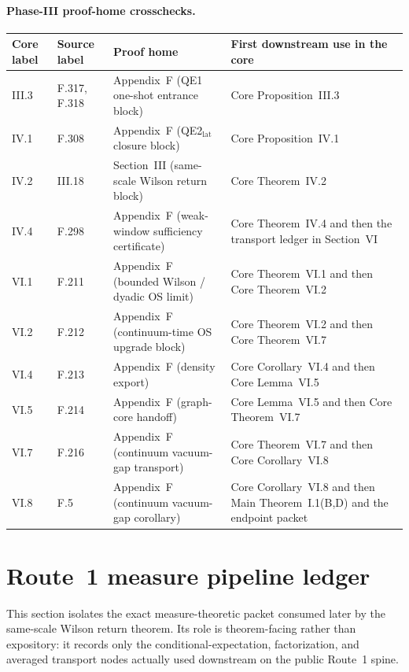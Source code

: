 \documentclass[preprint,aip,jmp,amsmath,amssymb,nofootinbib]{revtex4-2}
\begin{document}
\paragraph{Phase-III proof-home crosschecks.}
\begin{center}
\small
\setlength{\tabcolsep}{4pt}
\renewcommand{\arraystretch}{1.08}
\begin{tabular}{@{}p{0.95cm}p{1.2cm}p{4.0cm}p{4.2cm}@{}}
\toprule
\textbf{Core label} & \textbf{Source label} & \textbf{Proof home} & \textbf{First downstream use in the core}\\
\midrule
III.3 & F.317, F.318 & Appendix~F (QE1 one-shot entrance block) & Core Proposition~III.3\\
IV.1 & F.308 & Appendix~F (QE2$_{\mathrm{lat}}$ closure block) & Core Proposition~IV.1\\
IV.2 & III.18 & Section~III (same-scale Wilson return block) & Core Theorem~IV.2\\
IV.4 & F.298 & Appendix~F (weak-window sufficiency certificate) & Core Theorem~IV.4 and then the transport ledger in Section~VI\\
VI.1 & F.211 & Appendix~F (bounded Wilson / dyadic OS limit) & Core Theorem~VI.1 and then Core Theorem~VI.2\\
VI.2 & F.212 & Appendix~F (continuum-time OS upgrade block) & Core Theorem~VI.2 and then Core Theorem~VI.7\\
VI.4 & F.213 & Appendix~F (density export) & Core Corollary~VI.4 and then Core Lemma~VI.5\\
VI.5 & F.214 & Appendix~F (graph-core handoff) & Core Lemma~VI.5 and then Core Theorem~VI.7\\
VI.7 & F.216 & Appendix~F (continuum vacuum-gap transport) & Core Theorem~VI.7 and then Core Corollary~VI.8\\
VI.8 & F.5 & Appendix~F (continuum vacuum-gap corollary) & Core Corollary~VI.8 and then Main Theorem~I.1(B,D) and the endpoint packet\\
\bottomrule
\end{tabular}
\end{center}

\section{Route~1 measure pipeline ledger}
This section isolates the exact measure-theoretic packet consumed later by the same-scale Wilson return theorem. Its role is theorem-facing rather than expository: it records only the conditional-expectation, factorization, and averaged transport nodes actually used downstream on the public Route~1 spine.
\end{document}
